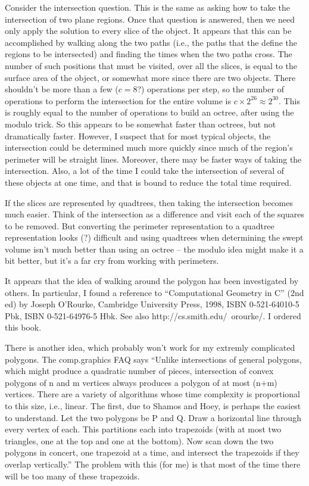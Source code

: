 \documentclass[titlepage,oneside,10pt]{article}
\begin{document}
Consider the intersection question. This is the same as asking how to
take the intersection of two plane regions. Once that question is
answered, then we need only apply the solution to every slice of the
object. It appears that this can be accomplished by walking along the
two paths (i.e., the paths that the define the regions to be
intersected) and finding the times when the two paths cross. The
number of such positions that must be visited, over all the slices, is
equal to the surface area of the object, or somewhat more since there
are two objects. There shouldn't be more than a few ($c =8$?) operations
per step, so the number of operations to perform the intersection for
the entire volume is $c\times 2^{26}\approx 2^{30}$. This is roughly
equal to the number of operations to build an octree, after using the
modulo trick. So this appears to be somewhat faster than octrees, but
not dramatically faster. However, I suspect that for most typical
objects, the intersection could be determined much more quickly since
much of the region's perimeter will be straight lines. Moreover, there
may be faster ways of taking the intersection. Also, a lot of the time
I could take the intersection of several of these objects at one time,
and that is bound to reduce the total time required.

If the slices are represented by quadtrees, then taking
the intersection becomes much easier. Think of the intersection as a
difference and visit each of the squares to be removed. But converting
the perimeter representation to a quadtree representation looks (?)
difficult and using quadtrees when determining the swept volume isn't
much better than using an octree -- the modulo idea might make it a
bit better, but it's a far cry from working with perimeters.

It appears that the idea of walking around the polygon has been
investigated by others. In particular, I found a reference to
``Computational Geometry in C'' (2nd ed) by Joseph O'Rourke, Cambridge
University Press, 1998, ISBN 0-521-64010-5 Pbk, ISBN 0-521-64976-5
Hbk. See also http://cs.smith.edu/~orourke/. I ordered this book.

There is another idea, which probably won't work for my extremly
complicated polygons. The comp.graphics FAQ says ``Unlike
intersections of general polygons, which might produce a quadratic
number of pieces, intersection of convex polygons of n and m vertices
always produces a polygon of at most (n+m) vertices. There are a
variety of algorithms whose time complexity is proportional to this
size, i.e., linear.  The first, due to Shamos and Hoey, is perhaps the
easiest to understand.  Let the two polygons be P and Q.  Draw a
horizontal line through every vertex of each.  This partitions each
into trapezoids (with at most two triangles, one at the top and one at
the bottom).  Now scan down the two polygons in concert, one trapezoid
at a time, and intersect the trapezoids if they overlap vertically.''
The problem with this (for me) is that most of the time there will be
too many of these trapezoids.
\end{document}
